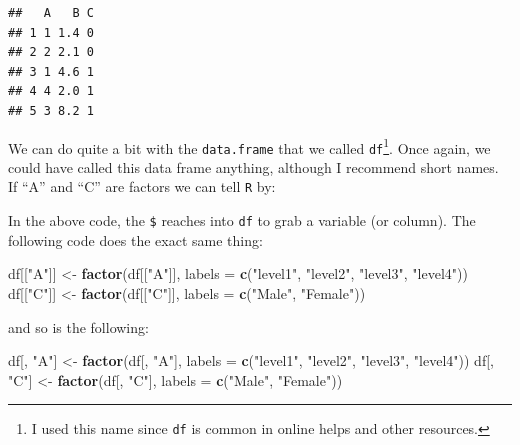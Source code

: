 \documentclass[]{tufte-book}
\newenvironment{Shaded}{}{}
\newcommand{\KeywordTok}[1]{\textcolor[rgb]{0.00,0.44,0.13}{\textbf{#1}}}
\newcommand{\DataTypeTok}[1]{\textcolor[rgb]{0.56,0.13,0.00}{#1}}
\newcommand{\StringTok}[1]{\textcolor[rgb]{0.25,0.44,0.63}{#1}}
\newcommand{\OperatorTok}[1]{\textcolor[rgb]{0.40,0.40,0.40}{#1}}
\newcommand{\NormalTok}[1]{#1}
\theoremstyle{definition}
\theoremstyle{definition}
\theoremstyle{remark}
\begin{document}
\begin{verbatim}
##   A   B C
## 1 1 1.4 0
## 2 2 2.1 0
## 3 1 4.6 1
## 4 4 2.0 1
## 5 3 8.2 1
\end{verbatim}

We can do quite a bit with the \texttt{data.frame} that we called
\texttt{df}\footnote{I used this name since \texttt{df} is common in
  online helps and other resources.}. Once again, we could have called
this data frame anything, although I recommend short names. If ``A'' and
``C'' are factors we can tell \texttt{R} by:

\begin{Shaded}
\end{Shaded}

In the above code, the \texttt{\$} reaches into \texttt{df} to grab a
variable (or column). The following code does the exact same thing:

\begin{Shaded}
\begin{Highlighting}[]
\NormalTok{df[[}\StringTok{"A"}\NormalTok{]] <-}\StringTok{ }\KeywordTok{factor}\NormalTok{(df[[}\StringTok{"A"}\NormalTok{]], }\DataTypeTok{labels =} \KeywordTok{c}\NormalTok{(}\StringTok{"level1"}\NormalTok{, }
    \StringTok{"level2"}\NormalTok{, }\StringTok{"level3"}\NormalTok{, }\StringTok{"level4"}\NormalTok{))}
\NormalTok{df[[}\StringTok{"C"}\NormalTok{]] <-}\StringTok{ }\KeywordTok{factor}\NormalTok{(df[[}\StringTok{"C"}\NormalTok{]], }\DataTypeTok{labels =} \KeywordTok{c}\NormalTok{(}\StringTok{"Male"}\NormalTok{, }
    \StringTok{"Female"}\NormalTok{))}
\end{Highlighting}
\end{Shaded}

and so is the following:

\begin{Shaded}
\begin{Highlighting}[]
\NormalTok{df[, }\StringTok{"A"}\NormalTok{] <-}\StringTok{ }\KeywordTok{factor}\NormalTok{(df[, }\StringTok{"A"}\NormalTok{], }\DataTypeTok{labels =} \KeywordTok{c}\NormalTok{(}\StringTok{"level1"}\NormalTok{, }
    \StringTok{"level2"}\NormalTok{, }\StringTok{"level3"}\NormalTok{, }\StringTok{"level4"}\NormalTok{))}
\NormalTok{df[, }\StringTok{"C"}\NormalTok{] <-}\StringTok{ }\KeywordTok{factor}\NormalTok{(df[, }\StringTok{"C"}\NormalTok{], }\DataTypeTok{labels =} \KeywordTok{c}\NormalTok{(}\StringTok{"Male"}\NormalTok{, }
    \StringTok{"Female"}\NormalTok{))}
\end{Highlighting}
\end{Shaded}
\end{document}
